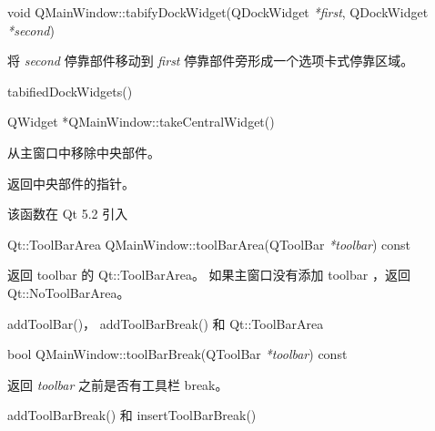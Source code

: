 \splitLine

void QMainWindow::tabifyDockWidget(QDockWidget \emph{*first}, QDockWidget \emph{*second})

将 \emph{second} 停靠部件移动到 \emph{first} 停靠部件旁形成一个选项卡式停靠区域。

\begin{notice}[另请参阅]
tabifiedDockWidgets()
\end{notice}

\splitLine

QWidget *QMainWindow::takeCentralWidget()

从主窗口中移除中央部件。

返回中央部件的指针。

该函数在 Qt 5.2 引入

\splitLine

Qt::ToolBarArea QMainWindow::toolBarArea(QToolBar \emph{*toolbar}) const

返回 toolbar 的 Qt::ToolBarArea。
 如果主窗口没有添加 toolbar ，返回 Qt::NoToolBarArea。

\begin{notice}[另请参阅]
addToolBar()， addToolBarBreak() 和 Qt::ToolBarArea
\end{notice}

\splitLine

bool QMainWindow::toolBarBreak(QToolBar \emph{*toolbar}) const

返回 \emph{toolbar} 之前是否有工具栏 break。

\begin{notice}[另请参阅]
addToolBarBreak() 和 insertToolBarBreak()
    \end{notice}